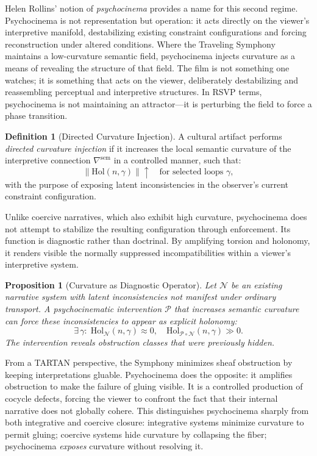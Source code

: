 \documentclass[12pt, oneside]{article}
\theoremstyle{plain}
\newtheorem{proposition}[theorem]{Proposition}
\theoremstyle{definition}
\newtheorem{definition}[theorem]{Definition}
\theoremstyle{remark}
\begin{document}
Helen Rollins' notion of \emph{psychocinema} provides a name for
this second regime. Psychocinema is not representation but
operation: it acts directly on the viewer's interpretive manifold,
destabilizing existing constraint configurations and forcing
reconstruction under altered conditions. Where the Traveling
Symphony maintains a low-curvature semantic field, psychocinema
injects curvature as a means of revealing the structure of that
field. The film is not something one watches; it is something that
acts on the viewer, deliberately destabilizing and reassembling
perceptual and interpretive structures. In RSVP terms, psychocinema
is not maintaining an attractor---it is perturbing the field to
force a phase transition.

\begin{definition}[Directed Curvature Injection]
A cultural artifact performs \emph{directed curvature injection}
if it increases the local semantic curvature of the interpretive
connection $\nabla^{\mathrm{sem}}$ in a controlled manner, such
that:
\[
  \|\mathrm{Hol}(n, \gamma)\| \uparrow
  \quad \text{for selected loops } \gamma,
\]
with the purpose of exposing latent inconsistencies in the
observer's current constraint configuration.
\end{definition}

Unlike coercive narratives, which also exhibit high curvature,
psychocinema does not attempt to stabilize the resulting
configuration through enforcement. Its function is diagnostic
rather than doctrinal. By amplifying torsion and holonomy, it
renders visible the normally suppressed incompatibilities within
a viewer's interpretive system.

\begin{proposition}[Curvature as Diagnostic Operator]
\label{prop:curvature-diagnostic}
Let $\mathcal{N}$ be an existing narrative system with latent
inconsistencies not manifest under ordinary transport. A
psychocinematic intervention $\mathcal{P}$ that increases semantic
curvature can force these inconsistencies to appear as explicit
holonomy:
\[
  \exists\, \gamma :\;
  \mathrm{Hol}_{\mathcal{N}}(n, \gamma) \approx 0,
  \quad
  \mathrm{Hol}_{\mathcal{P}\circ\mathcal{N}}(n, \gamma) \gg 0.
\]
The intervention reveals obstruction classes that were previously
hidden.
\end{proposition}

From a TARTAN perspective, the Symphony minimizes sheaf obstruction
by keeping interpretations gluable. Psychocinema does the opposite:
it amplifies obstruction to make the failure of gluing visible. It
is a controlled production of cocycle defects, forcing the viewer
to confront the fact that their internal narrative does not globally
cohere. This distinguishes psychocinema sharply from both
integrative and coercive closure: integrative systems minimize
curvature to permit gluing; coercive systems hide curvature by
collapsing the fiber; psychocinema \emph{exposes} curvature without
resolving it.
\end{document}
